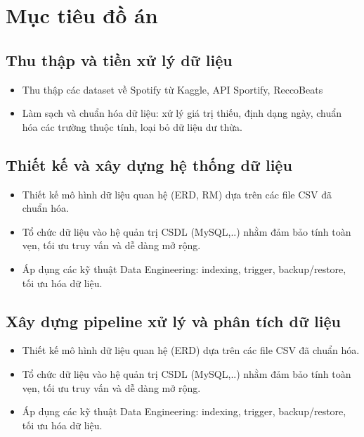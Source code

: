 \documentclass{../hcmut-report}
\begin{document}
\section{Mục tiêu đồ án}

\subsection{Thu thập và tiền xử lý dữ liệu}
\begin{itemize}
    \item Thu thập các dataset về Spotify từ Kaggle, API Sportify, ReccoBeats
    \item Làm sạch và chuẩn hóa dữ liệu: xử lý giá trị thiếu, định dạng ngày, chuẩn hóa các trường thuộc tính, loại bỏ dữ liệu dư thừa.
\end{itemize}

\subsection{Thiết kế và xây dựng hệ thống dữ liệu}
\begin{itemize}
    \item Thiết kế mô hình dữ liệu quan hệ (ERD, RM) dựa trên các file CSV đã chuẩn hóa.
    \item Tổ chức dữ liệu vào hệ quản trị CSDL (MySQL,..) nhằm đảm bảo tính toàn vẹn, tối ưu truy vấn và dễ dàng mở rộng.
    \item Áp dụng các kỹ thuật Data Engineering: indexing, trigger, backup/restore, tối ưu hóa dữ liệu.
\end{itemize}

\subsection{Xây dựng pipeline xử lý và phân tích dữ liệu}
\begin{itemize}
    \item Thiết kế mô hình dữ liệu quan hệ (ERD) dựa trên các file CSV đã chuẩn hóa.
    \item Tổ chức dữ liệu vào hệ quản trị CSDL (MySQL,..) nhằm đảm bảo tính toàn vẹn, tối ưu truy vấn và dễ dàng mở rộng.
    \item Áp dụng các kỹ thuật Data Engineering: indexing, trigger, backup/restore, tối ưu hóa dữ liệu.
\end{itemize}
\end{document}
